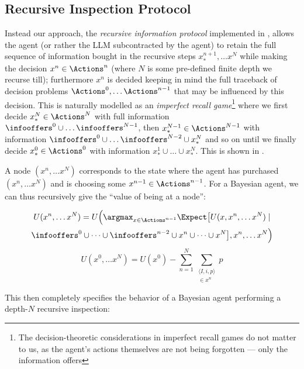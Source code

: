 \subsection{Recursive Inspection Protocol}
\label{infonomy:app:nonnaive}

Instead our approach, the \emph{recursive information protocol} implemented in , allows the agent (or rather the LLM subcontracted by the agent) to retain the full sequence of information bought in the recursive steps $x^{n+1}_*,\dots x^N$ while making the decision $x^n\in\Actions^n$ (where $N$ is some pre-defined finite depth we recurse till); furthermore $x^n$ is decided keeping in mind the full traceback of decision problems $\Actions^0,\dots\Actions^{n-1}$ that may be influenced by this decision. This is naturally modelled as an \emph{imperfect recall game}\footnote{The decision-theoretic considerations in imperfect recall games do not matter to us, as the agent's actions themselves are not being forgotten --- only the information offers}  where we first decide $x_*^N\in\Actions^N$ with full information $\infooffers^0\cup\dots\infooffers^{N-1}$, then $x_*^{N-1}\in\Actions^{N-1}$ with information $\infooffers^0\cup\dots\infooffers^{N-2}\cup x_*^{N}$ and so on until we finally decide $x_*^0\in\Actions^0$ with information $x_*^1\cup\dots \cup x_*^N$. This is shown in .

A node $(x^n,\dots x^N)$ corresponds to the state where the agent has purchased $(x^n,\dots x^N)$ and is choosing some $x^{n-1}\in\Actions^{n-1}$. For a Bayesian agent, we can thus recursively give the ``value of being at a node'':

\begin{multline}
  U(x^n,\dots x^N) = U\Big(
    \argmax_{x\in\Actions^{n-1}}
    \Expect\bigl[
      U(x,x^n,\dots x^N) \mid \\
      \infooffers^0\cup\dots\cup\infooffers^{n-2}\cup
      x^n\cup\dots\cup x^N
    \bigr],
    x^n,\dots x^N
  \Big)
  \label{infonomy:eq:imperfect-u}
\end{multline}
\begin{equation}
  U(x^0,\dots x^N) = U(x^0) - \sum_{n=1}^N \sum_{\substack{\langle I, i, p\rangle \\ \in x^n}} p
  \label{infonomy:eq:imperfect-u0}
\end{equation}

This then completely specifies the behavior of a Bayesian agent performing a depth-$N$ recursive inspection:


